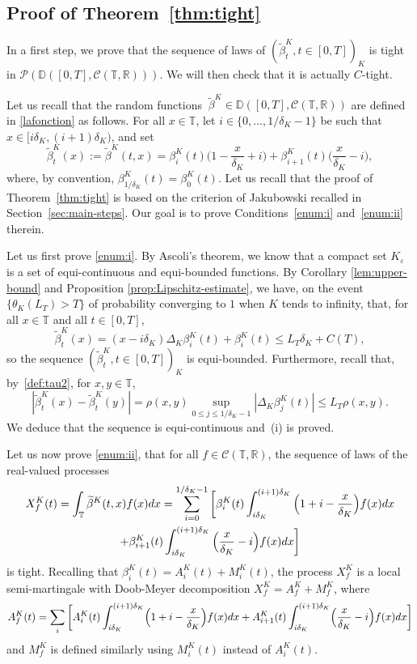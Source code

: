 \documentclass[JEP,XML,SOM,Unicode,published]{cedram}
\let\cal\mathcal
\let\f\frac
\theoremstyle{plain}
\theoremstyle{remark}
\newcommand{\Co}{\mathcal{C}}
\newcommand\T{\mathbb{T}}
\begin{document}
\subsection{Proof of Theorem~\ref{thm:tight}}
\label{sec:tight}

In a first step, we prove that the sequence of laws of $(\tilde \beta^K_{t}, t\in[0,T])_{K}$ is tight in ${\cal P}(\mathbb{D}([0,T], \Co(\T,\mathbb{R})))$. We will then check that it is actually $C$-tight.

Let us recall that the random functions $\ \tilde \beta^K\in\mathbb{D}([0,T], \Co(\T,\mathbb{R}))$ are defined in \eqref{lafonction} as follows. For all $x\in\T$, let $i\in\{0,\ldots,1/\delta_K-1\}$ be such that $x\in [i\delta_K,(i+1)\delta_K)$, and set
\[
\widetilde \beta^K_{t}(x):=\widetilde \beta^K(t,x) =\beta_i^K(t)\Big(1-\f {x}{\delta_K}+i\Big)+\beta_{i+1}^K(t)\Big(\f {x}{\delta_K}-i\Big),
\]
where, by convention, $\beta^K_{1/\delta_K}(t)=\beta^K_0(t)$.
Let us recall that the proof of Theorem~\ref{thm:tight} is based on the criterion of Jakubowski \cite{jakubowski} recalled in Section~\ref{sec:main-steps}. Our goal is to prove Conditions~\eqref{enum:i} and~\eqref{enum:ii} therein.

Let us first prove \eqref{enum:i}. By Ascoli's theorem, we know that a compact set $K_{\varepsilon}$ is a set of equi-continuous and equi-bounded functions. By Corollary \ref{lem:upper-bound} and Proposition \ref{prop:Lipschitz-estimate}, we have, on the event $\{\theta_K(L_T)>T\}$ of probability converging to $1$ when $K$ tends to infinity,
that, for all $x\in\T$ and all $t\in[0,T]$,
\[\widetilde \beta^K_{t}(x) =(x-i\delta_K)\Delta_K\beta^K_i(t) + \beta_{i}^K(t) \leq L_T\delta_K +C(T),\]
so the sequence $(\widetilde \beta^K_{t}, t\in[0,T])_{K}$ is equi-bounded.
Furthermore, recall that, by~\eqref{def:tau2}, for $x,y\in\T$,
\[\left|\widetilde \beta^K_{t}(x)-\widetilde \beta^K_{t}(y)\right|= \rho(x,y)\sup_{0\leq j\leq 1/\delta_K-1}\left|\Delta_K\beta^K_j(t)\right|
\leq L_T \rho(x,y).\]
We deduce that the sequence is equi-continuous and~(i) is proved.

Let us now prove \eqref{enum:ii}, \ie that for all
$f\in \Co(\T,\mathbb{R})$, the sequence of laws of the real-valued processes
\begin{multline*}
X^K_f(t)= \int_\T \widetilde \beta^K(t,x) f(x) dx =\sum_{i=0}^{1/\delta_K-1} \bigg[\beta^K_{i}(t) \int_{i\delta_{K}}^{(i+1)\delta_{K}} \Big(1+i -{x\over \delta_{K}} \Big)f(x)dx \\
+\beta^K_{i+1}(t) \int_{i\delta_{K}}^{(i+1)\delta_{K}} \Big({x\over \delta_{K}}-i\Big) f(x)dx \bigg]
\end{multline*}
is tight. Recalling that $\beta_{i}^K(t)= A^K_{i}(t) + M^K_{i}(t)$, the process $X^K_f$ is a local semi-martingale with Doob-Meyer decomposition
$X^K_{f} = A^K_{f} + M^K_{f} $, where
\[
A^K_{f} (t) = \sum_{i} \bigg[A^K_{i}(t) \int_{i\delta_{K}}^{(i+1)\delta_{K}} \Bigl(1+i -{x\over \delta_{K}}\Bigr)f(x)dx +A^K_{i+1}(t) \int_{i\delta_{K}}^{(i+1)\delta_{K}} \Bigl({x\over \delta_{K}}-i\Bigr) f(x)dx \bigg]
\]
and $M^K_f$ is defined similarly using $M^K_i(t)$ instead of $A^K_i(t)$.
\end{document}
